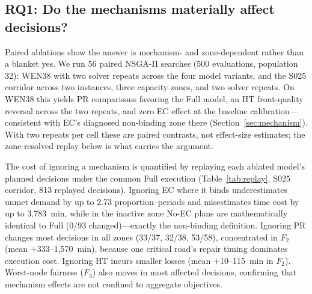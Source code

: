 \documentclass[10pt,conference,letterpaper]{IEEEtran}
\begin{document}
\subsection{RQ1: Do the mechanisms materially affect decisions?}

Paired ablations show the answer is mechanism- and zone-dependent rather
than a blanket yes. We run 56 paired NSGA-II searches (500 evaluations,
population 32): WEN38 with two solver repeats across the four model
variants, and the S025 corridor across two instances, three capacity
zones, and two solver repeats. On WEN38 this yields PR comparisons
favoring the Full model, an HT front-quality reversal across the two
repeats, and zero EC effect at the baseline calibration---consistent with
EC's diagnosed non-binding zone there (Section~\ref{sec:mechanism}). With
two repeats per cell these are paired contrasts, not effect-size
estimates; the zone-resolved replay below is what carries the argument.

The cost of ignoring a mechanism is quantified by replaying each
ablated model's planned decisions under the common Full execution
(Table~\ref{tab:replay}, S025 corridor, 813 replayed decisions).
Ignoring EC where it binds underestimates unmet demand by up to 2.73
proportion--periods and misestimates time cost by up to 3{,}783~min, while
in the inactive zone No-EC plans are mathematically identical to Full
(0/93 changed)---exactly the non-binding definition. Ignoring PR changes
most decisions in all zones (33/37, 32/38, 53/58), concentrated in $F_2$
(mean $+$333--1{,}570~min), because one critical road's repair timing
dominates execution cost. Ignoring HT incurs smaller losses (mean
$+$10--115~min in $F_2$). Worst-node fairness ($F_3$) also moves in most
affected decisions, confirming that mechanism effects are not confined
to aggregate objectives.
\end{document}
